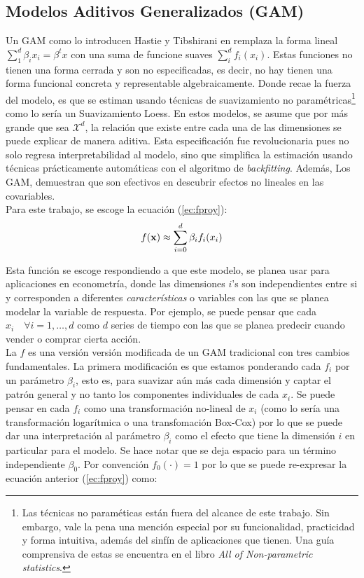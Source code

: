 \documentclass[../Main/Main.tex]{subfiles}
\begin{document}
\subsection{Modelos Aditivos Generalizados (GAM)} \label{sec:GAM}
Un GAM como lo introducen Hastie y Tibshirani en \autocite{hastie1986generalized} remplaza la forma lineal $\sum_{1}^d\beta_ix_i = \beta^tx$ con una suma de funcione suaves $\sum_i^d f_i(x_i)$. Estas funciones no tienen una forma cerrada y son no especificadas, es decir, no hay tienen una forma funcional concreta y representable algebraicamente. Donde recae la fuerza del modelo, es que se estiman usando técnicas de suavizamiento no paramétricas\footnote{Las técnicas no paraméticas están fuera del alcance de este trabajo. Sin embargo, vale la pena una mención especial por su funcionalidad, practicidad y forma intuitiva, además del sinfín de aplicaciones que tienen. Una guía comprensiva de estas se encuentra en el libro \textit{All of Non-parametric statistics}\autocite{wasserman2007all}.} como lo sería un Suavizamiento Loess. En estos modelos, se asume que por más grande que sea $\mathcal{X}^d$, la relación que existe entre cada una de las dimensiones se puede explicar de manera aditiva. Esta especificación fue revolucionaria pues no solo regresa interpretabilidad al modelo, sino que simplifica la estimación usando técnicas prácticamente automáticas con el algoritmo de \textit{backfitting}. Además, Los GAM, demuestran que son efectivos en descubrir efectos no lineales en las covariables. \\

Para este trabajo, se escoge la ecuación (\ref{ec:fproy}): 
\begin{align*}
	f(\mathbf{x}) \approx \sum_{i=0}^d \beta_i f_i(x_i) 
\end{align*}

Esta función se escoge respondiendo a que este modelo, se planea usar para aplicaciones en econometría, donde las dimensiones $i$'s son independientes entre si y corresponden a diferentes \textit{características} o variables con las que se planea modelar la variable de respuesta. Por ejemplo, se puede pensar que cada $x_i \quad \forall i=1,\ldots,d$ como $d$ series de tiempo con las que se planea predecir cuando vender o comprar cierta acción.\\

La $f$ es una versión versión modificada de un GAM tradicional con tres cambios fundamentales. La primera modificación es que estamos ponderando cada $f_i$ por un parámetro $\beta_i$, esto es, para suavizar aún más cada dimensión y captar el patrón general y no tanto los componentes individuales de cada $x_i$. Se puede pensar en cada $f_i$ como una transformación no-lineal de $x_i$ (como lo sería una transformación logarítmica o una transfomación Box-Cox) por lo que se puede dar una interpretación al parámetro $\beta_i$ como el efecto que tiene la dimensión $i$ en particular para el modelo. Se hace notar que se deja espacio para un término independiente $\beta_0$. Por convención $f_0(\cdot) = 1$ por lo que se puede re-expresar la ecuación anterior (\ref{ec:fproy}) como:
\end{document}
